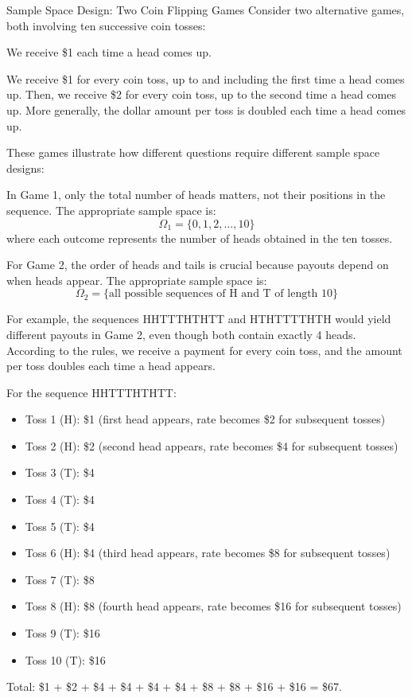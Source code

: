 \begin{exampleboxbreak}{Sample Space Design: Two Coin Flipping Games}
Consider two alternative games, both involving ten successive coin tosses:

 We receive \$1 each time a head comes up.

 We receive \$1 for every coin toss, up to and including the first time a head comes up. Then, we receive \$2 for every coin toss, up to the second time a head comes up. More generally, the dollar amount per toss is doubled each time a head comes up.

These games illustrate how different questions require different sample space designs:

In Game 1, only the total number of heads matters, not their positions in the sequence. The appropriate sample space is:
\[ \Omega_1 = \{0, 1, 2, \ldots, 10\} \]
where each outcome represents the number of heads obtained in the ten tosses.

For Game 2, the order of heads and tails is crucial because payouts depend on when heads appear. The appropriate sample space is:
\[ \Omega_2 = \{\text{all possible sequences of H and T of length 10}\} \]

For example, the sequences HHTTTHTHTT and HTHTTTTHTH would yield different payouts in Game 2, even though both contain exactly 4 heads. According to the rules, we receive a payment for every coin toss, and the amount per toss doubles each time a head appears. 

For the sequence HHTTTHTHTT:
\begin{itemize}
    \item Toss 1 (H): \$1 (first head appears, rate becomes \$2 for subsequent tosses)
    \item Toss 2 (H): \$2 (second head appears, rate becomes \$4 for subsequent tosses)
    \item Toss 3 (T): \$4
    \item Toss 4 (T): \$4
    \item Toss 5 (T): \$4
    \item Toss 6 (H): \$4 (third head appears, rate becomes \$8 for subsequent tosses)
    \item Toss 7 (T): \$8
    \item Toss 8 (H): \$8 (fourth head appears, rate becomes \$16 for subsequent tosses)
    \item Toss 9 (T): \$16
    \item Toss 10 (T): \$16
\end{itemize}
Total: \$1 + \$2 + \$4 + \$4 + \$4 + \$4 + \$8 + \$8 + \$16 + \$16 = \$67.


\end{exampleboxbreak}
